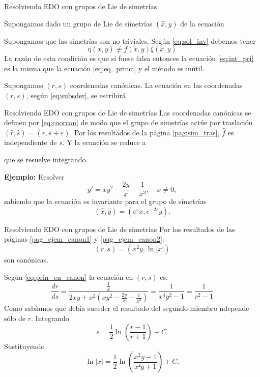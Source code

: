 \documentclass[handout,hyperref={colorlinks=true}]{beamer}
\renewcommand{\epsilon}{\varepsilon}
\begin{document}
\begin{frame}{Resolviendo EDO con grupos de Lie de simetrías}

\onslide<+-> Supongamos dado  un grupo de Lie de simetrías $(\hat{x},\hat{y})$ de la ecuación

\onslide<+-> Supongamos  que las simetrías son no triviales. Según \eqref{eq:sol_inv} debemos tener
 \[\eta(x,y)\not\equiv f(x,y)\xi(x,y)\]
La razón de esta condición es que si fuese falsa entonces la ecuación \eqref{eq:int_pri} es la misma que la ecuación \eqref{eq:eq_princi} y el método es inútil.

\onslide<+->Supongamos $(r,s)$ coordenadas canónicas. La ecuación en las coordenadas $(r,s)$, según \eqref{eq:subsder}, se escribirá
 
\end{frame}


\begin{frame}{Resolviendo EDO con grupos de Lie de simetrías}
\onslide<+->Las coordenadas canónicas se definen por \eqref{eq:coorcan} de modo que el grupo de simetrías actúe por traslación $(\hat{r},\hat{s})=(r,s+\epsilon)$. 
\onslide<+->Por los resultados de la página  \ref{pag:sim_tras}, $\hat{f}$ es independiente de $s$. Y la ecuación se reduce a

que se resuelve integrando.


\onslide<+->\textbf{Ejemplo:} Resolver 
\[y'=xy^2-\frac{2y}{x}-\frac{1}{x^3},\quad x\neq 0,\]
sabiendo que la ecuación es invariante para el grupo de simetrías
\[(\hat{x},\hat{y})=(e^{\epsilon}x,e^{-2\epsilon}y).\]
\end{frame}


\begin{frame}{Resolviendo EDO con grupos de Lie de simetrías}
\onslide<+->Por los resultados de las páginas \ref{pag_ejem_canon1} y \ref{pag_ejem_canon2}:
\[(r,s)=(x^2y,\ln|x|)\]
son canónicas.

\onslide<+-> Según \eqref{eq:prin_en_canon} la ecuación en $(r,s)$ es:
\[\frac{dr}{ds}=\frac{\frac{1}{x}}{2xy+x^2\left(  xy^2-\frac{2y}{x}-\frac{1}{x^3}     \right)}=\frac{1}{x^4y^2-1}=\frac{1}{r^2-1}\]
Como sabíamos que debía suceder el resultado del segundo miembro ndepende sólo de $r$. Integrando
\[s=\frac12\ln\left( \frac{r-1}{r+1}  \right)+C.\]
Sustituyendo
\[\ln|x|=\frac12\ln\left( \frac{x^2y-1}{x²y+1}  \right)+C.\]



\end{frame}
\end{document}
